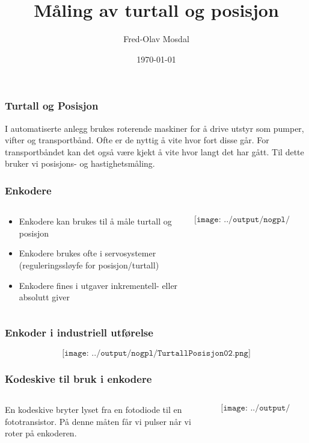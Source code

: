 \documentclass[aspectratio=169,xcolor=dvipsnames]{beamer}
\title[posisjon]{Måling av turtall og posisjon} %
\author[Fred-Olav] {Fred-Olav Mosdal}
\institute[Gand VGS] %
{
    Gand VGS \\
    VG3 Automasjon }
\date{\today} %
\begin{document}
\begin{frame}
	\frametitle{Turtall og Posisjon}
	I automatiserte anlegg brukes roterende maskiner for å drive utstyr som pumper, vifter og transportbånd. 
	\vskip 0.5cm
	Ofte er de nyttig å vite hvor fort disse går. For transportbåndet kan det også være kjekt å vite hvor langt det har gått. 
	Til dette bruker vi posisjons- og hastighetsmåling. 
\end{frame}


\begin{frame}
	\frametitle{Enkodere}
	\begin{columns}
		\begin{column}{0.5\textwidth}
		\begin{itemize}
			\item Enkodere kan brukes til å måle turtall og posisjon
			\item Enkodere brukes ofte i servosystemer (reguleringssløyfe for posisjon/turtall)
				\item Enkodere fines i utgaver inkrementell- eller absolutt giver
		\end{itemize}	
		\end{column}

		\begin{column}{0.5\textwidth}
	$$\texttt{[image: ../output/nogpl/TurtallPosisjon01.png]}$$
		\end{column}
	\end{columns}
\end{frame}

\begin{frame}
	\frametitle{Enkoder i industriell utførelse}
	$$\texttt{[image: ../output/nogpl/TurtallPosisjon02.png]}$$
\end{frame}

\begin{frame}
	\frametitle{Kodeskive til bruk i enkodere}
	\begin{columns}
		\begin{column}{0.5\textwidth}
En kodeskive bryter lyset fra en fotodiode til en fototransistor. På denne måten får vi pulser når vi roter på enkoderen. 
			
		\end{column}

		\begin{column}{0.5\textwidth}
	$$\texttt{[image: ../output/nogpl/TurtallPosisjon03.png]}$$
		\end{column}
	\end{columns}
\end{frame}
\end{document}
